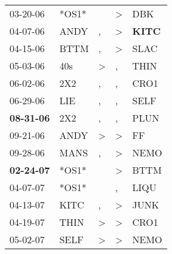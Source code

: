 \begin{supertabular}{p{0.07\textwidth}p{0.06\textwidth}p{0.02\textwidth}p{0.02\textwidth}p{0.06\textwidth}}
          03-20-06\textsuperscript{} &                            *OS1* &                  &     \textgreater &            DBK\textsuperscript{} \\
          04-07-06\textsuperscript{} &           ANDY\textsuperscript{} &                , &     \textgreater &  \textbf{KITC\textsuperscript{}} \\
          04-15-06\textsuperscript{} &           BTTM\textsuperscript{} &                , &     \textgreater &           SLAC\textsuperscript{} \\
          05-03-06\textsuperscript{} &            40s\textsuperscript{} &     \textgreater &                , &           THIN\textsuperscript{} \\
          06-02-06\textsuperscript{} &            2X2\textsuperscript{} &                , &                , &           CRO1\textsuperscript{} \\
          06-29-06\textsuperscript{} &            LIE\textsuperscript{} &                , &                , &           SELF\textsuperscript{} \\
 \textbf{08-31-06\textsuperscript{}} &            2X2\textsuperscript{} &                , &                , &           PLUN\textsuperscript{} \\
          09-21-06\textsuperscript{} &           ANDY\textsuperscript{} &     \textgreater &     \textgreater &             FF\textsuperscript{} \\
          09-28-06\textsuperscript{} &           MANS\textsuperscript{} &                , &     \textgreater &           NEMO\textsuperscript{} \\
 \textbf{02-24-07\textsuperscript{}} &                            *OS1* &                  &     \textgreater &           BTTM\textsuperscript{} \\
          04-07-07\textsuperscript{} &                            *OS1* &                  &                , &           LIQU\textsuperscript{} \\
          04-13-07\textsuperscript{} &           KITC\textsuperscript{} &                , &     \textgreater &           JUNK\textsuperscript{} \\
          04-19-07\textsuperscript{} &           THIN\textsuperscript{} &     \textgreater &     \textgreater &           CRO1\textsuperscript{} \\
          05-02-07\textsuperscript{} &           SELF\textsuperscript{} &     \textgreater &     \textgreater &           NEMO\textsuperscript{} \\

\end{supertabular}
